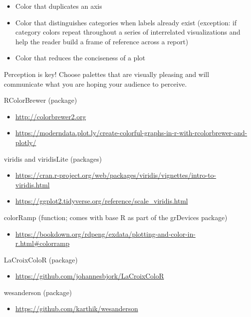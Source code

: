 \documentclass[]{article}
\providecommand{\tightlist}{%
  \setlength{\itemsep}{0pt}\setlength{\parskip}{0pt}}
\begin{document}
\begin{itemize}
\tightlist
\item
  Color that duplicates an axis
\item
  Color that distinguishes categories when labels already exist
  (exception: if category colors repeat throughout a series of
  interrelated visualizations and help the reader build a frame of
  reference across a report)
\item
  Color that reduces the conciseness of a plot
\end{itemize}

Perception is key! Choose palettes that are visually pleasing and will
communicate what you are hoping your audience to perceive.

RColorBrewer (package)

\begin{itemize}
\tightlist
\item
  \url{http://colorbrewer2.org}
\item
  \url{https://moderndata.plot.ly/create-colorful-graphs-in-r-with-rcolorbrewer-and-plotly/}
\end{itemize}

viridis and viridisLite (packages)

\begin{itemize}
\tightlist
\item
  \url{https://cran.r-project.org/web/packages/viridis/vignettes/intro-to-viridis.html}
\item
  \url{https://ggplot2.tidyverse.org/reference/scale_viridis.html}
\end{itemize}

colorRamp (function; comes with base R as part of the grDevices package)

\begin{itemize}
\tightlist
\item
  \url{https://bookdown.org/rdpeng/exdata/plotting-and-color-in-r.html\#colorramp}
\end{itemize}

LaCroixColoR (package)

\begin{itemize}
\tightlist
\item
  \url{https://github.com/johannesbjork/LaCroixColoR}
\end{itemize}

wesanderson (package)

\begin{itemize}
\tightlist
\item
  \url{https://github.com/karthik/wesanderson}
\end{itemize}
\end{document}
